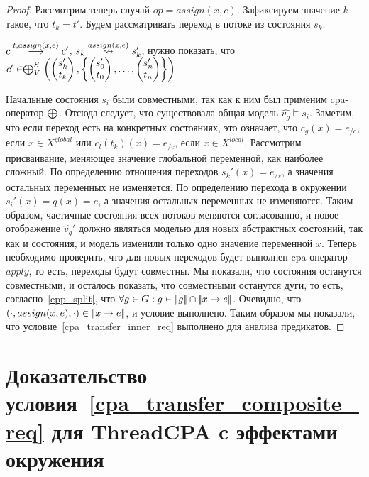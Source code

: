 \begin{proof}
Рассмотрим теперь случай $op = assign(x, e)$. Зафиксируем значение $k$ такое, что $t_k = t'$. Будем рассматривать переход в потоке из состояния $s_k$.

$c \stackrel{t, assign(x, e)}{\longrightarrow} c'$, $s_k \stackrel{assign(x, e)}{\leadsto} s_k'$, нужно показать, что 
$c' \in \mathrel{\bigoplus}^S_V
\left(
\begin{pmatrix}
s_k' \\
t_k 
\end{pmatrix},
\left\{
\begin{pmatrix}
s_0' \\
t_0 
\end{pmatrix},
\dots ,
\begin{pmatrix}
s_n' \\
t_n 
\end{pmatrix}
\right\}
\right)$

Начальные состояния $s_i$ были совместными, так как к ним был применим cpa-оператор $\mathrel{\bigoplus}$. 
Отсюда следует, что существовала общая модель $\hat{v_g} \models s_i$.
Заметим, что если переход есть на конкретных состояниях, это означает, что $c_g(x) = e_{/c}$, если $x \in X^{global}$ или $c_l(t_k)(x) = e_{/c}$, если $x \in X^{local}$.
Рассмотрим присваивание, меняющее значение глобальной переменной, как наиболее сложный.
По определению отношения переходов $s_k'(x) = e_{/s}$, а значения остальных переменных не изменяется.
По определению перехода в окружении $s_i'(x) = q(x) = e$, а значения остальных переменных не изменяются.
Таким образом, частичные состояния всех потоков меняются согласованно, и новое отображение $\hat{v_g}'$ должно являться моделью для новых абстрактных состояний, так как и состояния, и модель изменили только одно значение переменной $x$.
Теперь необходимо проверить, что для новых переходов будет выполнен cpa-оператор $apply$, то есть, переходы будут совместны.
Мы показали, что состояния останутся совместными, и осталось показать, что совместными останутся дуги, то есть, согласно~\ref{epp_split}, что $\forall g \in G: g \in \lvert \! \lvert g \rvert \! \rvert \cap \lvert \! \lvert x \to e \rvert \! \rvert$. 
Очевидно, что $(\cdot, assign(x, e), \cdot) \in \lvert \! \lvert x \to e \rvert \! \rvert$, и условие выполнено.
Таким образом мы показали, что условие~\ref{cpa_transfer_inner_req} выполнено для анализа предикатов.

\end{proof}


\section{Доказательство условия~\ref{cpa_transfer_composite_req} для ThreadCPA c эффектами окружения}
\label{sect_transfer_thread_env_proof}

